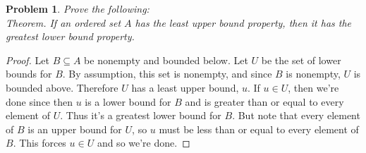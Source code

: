 \documentclass{article}
\newtheorem{problem}{Problem}
\begin{document}
\begin{problem}
Prove the following:\\
Theorem. If an ordered set $A$ has the least upper bound property, then it has the greatest lower bound property.
\end{problem}
\begin{proof}
Let $B \subseteq A$ be nonempty and bounded below. Let $U$ be the set of lower bounds for $B$. By assumption, this set is nonempty, and since $B$ is nonempty, $U$ is bounded above. Therefore $U$ has a least upper bound, $u$. If $u \in U$, then we're done since then $u$ is a lower bound for $B$ and is greater than or equal to every element of $U$. Thus it's a greatest lower bound for $B$. But note that every element of $B$ is an upper bound for $U$, so $u$ must be less than or equal to every element of $B$. This forces $u \in U$ and so we're done.
\end{proof}
\end{document}
